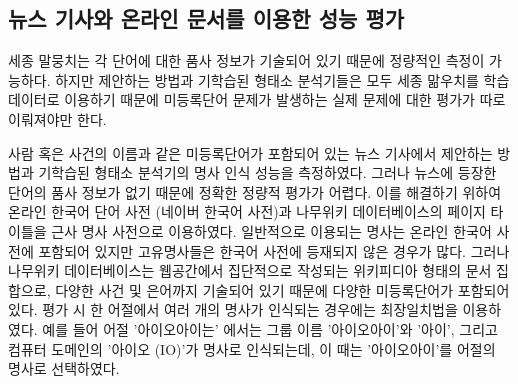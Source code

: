\documentclass[oneside, ko,phd]{snuthesis_utf8_kor}
\begin{document}
\begin{table}[ht]
\small
\centering
\caption{세종 말뭉치에서 명사로 추출된 빈도수가 작은 12 개의 명사 예시 (Logistic Regression 의 판별 확률, 출현 빈도수)}
\label{tab:sejong_infrequent}
\end{table}

\begin{table}[ht]
\small
\centering
\caption{세종 말뭉치에서 명사로 추출된 12 개의 명사 예시 (정렬 기준 = 판별 확률 $\times$ 출현 빈도수)}
\label{tab:sejong_frequent}
\end{table}


\subsection{뉴스 기사와 온라인 문서를 이용한 성능 평가}

세종 말뭉치는 각 단어에 대한 품사 정보가 기술되어 있기 때문에 정량적인 측정이 가능하다.
하지만 제안하는 방법과 기학습된 형태소 분석기들은 모두 세종 맒우치를 학습 데이터로 이용하기 때문에 미등록단어 문제가 발생하는 실제 문제에 대한 평가가 따로 이뤄져야만 한다.

사람 혹은 사건의 이름과 같은 미등록단어가 포함되어 있는 뉴스 기사에서 제안하는 방법과 기학습된 형태소 분석기의 명사 인식 성능을 측정하였다.
그러나 뉴스에 등장한 단어의 품사 정보가 없기 때문에 정확한 정량적 평가가 어렵다.
이를 해결하기 위하여 온라인 한국어 단어 사전 (네이버 한국어 사전)과 나무위키 데이터베이스의 페이지 타이틀을 근사 명사 사전으로 이용하였다.
일반적으로 이용되는 명사는 온라인 한국어 사전에 포함되어 있지만 고유명사들은 한국어 사전에 등재되지 않은 경우가 많다.
그러나 나무위키 데이터베이스는 웹공간에서 집단적으로 작성되는 위키피디아 형태의 문서 집합으로, 다양한 사건 및 은어까지 기술되어 있기 때문에 다양한 미등록단어가 포함되어 있다.
평가 시 한 어절에서 여러 개의 명사가 인식되는 경우에는 최장일치법을 이용하였다.
예를 들어 어절 '아이오아이는' 에서는 그룹 이름 '아이오아이'와 '아이', 그리고 컴퓨터 도메인의 '아이오 (IO)'가 명사로 인식되는데, 이 때는 '아이오아이'를 어절의 명사로 선택하였다.
\end{document}

